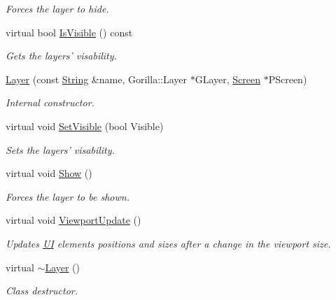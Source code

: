 \begin{DoxyCompactItemize}
\begin{DoxyCompactList}\small\item\em Forces the layer to hide. \item\end{DoxyCompactList}\item 
virtual bool \hyperlink{classMezzanine_1_1UI_1_1Layer_a8a9222e729f47a4cfec32325a03cf7f3}{IsVisible} () const 
\begin{DoxyCompactList}\small\item\em Gets the layers' visability. \item\end{DoxyCompactList}\item 
\hyperlink{classMezzanine_1_1UI_1_1Layer_a89adbb39b0c8058635a9d7c73d8d61d5}{Layer} (const \hyperlink{namespaceMezzanine_acf9fcc130e6ebf08e3d8491aebcf1c86}{String} \&name, Gorilla::Layer $\ast$GLayer, \hyperlink{classMezzanine_1_1UI_1_1Screen}{Screen} $\ast$PScreen)
\begin{DoxyCompactList}\small\item\em Internal constructor. \item\end{DoxyCompactList}\item 
virtual void \hyperlink{classMezzanine_1_1UI_1_1Layer_a00b524742cf51db97b17e7d8f6e995cf}{SetVisible} (bool Visible)
\begin{DoxyCompactList}\small\item\em Sets the layers' visability. \item\end{DoxyCompactList}\item 
\hypertarget{classMezzanine_1_1UI_1_1Layer_a02f08145c60a66b441cd37313cdfa9df}{
virtual void \hyperlink{classMezzanine_1_1UI_1_1Layer_a02f08145c60a66b441cd37313cdfa9df}{Show} ()}
\label{classMezzanine_1_1UI_1_1Layer_a02f08145c60a66b441cd37313cdfa9df}

\begin{DoxyCompactList}\small\item\em Forces the layer to be shown. \item\end{DoxyCompactList}\item 
virtual void \hyperlink{classMezzanine_1_1UI_1_1Layer_ae19b12ed20756cbf3bb666d7443e7b54}{ViewportUpdate} ()
\begin{DoxyCompactList}\small\item\em Updates \hyperlink{namespaceMezzanine_1_1UI}{UI} elements positions and sizes after a change in the viewport size. \item\end{DoxyCompactList}\item 
\hypertarget{classMezzanine_1_1UI_1_1Layer_a8f900ee91964b4103ce369e82a7a0739}{
virtual \hyperlink{classMezzanine_1_1UI_1_1Layer_a8f900ee91964b4103ce369e82a7a0739}{$\sim$Layer} ()}
\label{classMezzanine_1_1UI_1_1Layer_a8f900ee91964b4103ce369e82a7a0739}

\begin{DoxyCompactList}\small\item\em Class destructor. \item\end{DoxyCompactList}\end{DoxyCompactItemize}
